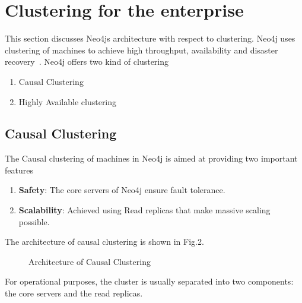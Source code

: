 \documentclass[9pt,twocolumn,twoside]{styles/osajnl}
\begin{document}
\section{Clustering for the enterprise}
This section discusses Neo4js architecture with respect to clustering. Neo4j uses clustering of machines to achieve high throughput, availability and disaster recovery~\cite{www-neo4j}. Neo4j offers two kind of clustering 
\begin{enumerate}
    \item Causal Clustering
    \item Highly Available clustering
\end{enumerate}

\subsection{Causal Clustering}
The Causal clustering of machines in Neo4j is aimed at providing two important features~\cite{www-neo4j-causal}
\begin{enumerate}
    \item \textbf{Safety}: The core servers of Neo4j ensure fault tolerance.
    \item \textbf{Scalability}: Achieved using Read replicas that make massive scaling possible.
\end{enumerate}
The architecture of causal clustering is shown in Fig.2.
\begin{figure}[htbp]
\centering
{}
\caption{Architecture of Causal Clustering ~\cite{www-neo4j-causal}}
\label{fig:false-color}
\end{figure}

For operational purposes, the cluster is usually separated into two components: the core servers and the read replicas. 
\end{document}
